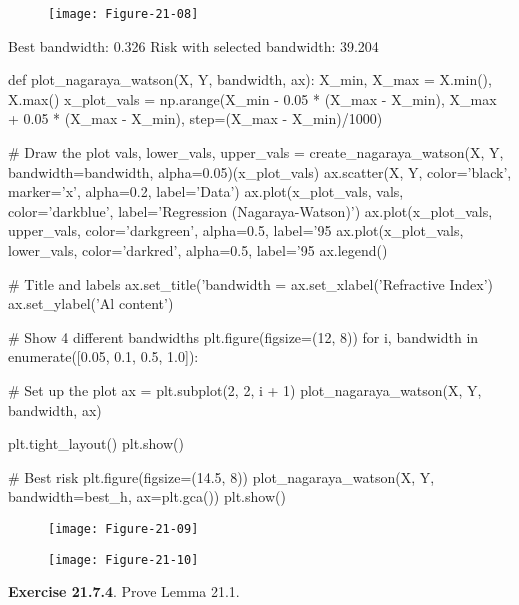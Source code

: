 \begin{figure}[H]
\texttt{[image: Figure-21-08]}
\end{figure}

\begin{console}
Best bandwidth:                 0.326
Risk with selected bandwidth:   39.204
\end{console}

\begin{python}
def plot_nagaraya_watson(X, Y, bandwidth, ax):
    X_min, X_max = X.min(), X.max()
    x_plot_vals = np.arange(X_min - 0.05 * (X_max - X_min), X_max + 0.05 * (X_max - X_min), step=(X_max - X_min)/1000)
      
    # Draw the plot
    vals, lower_vals, upper_vals = create_nagaraya_watson(X, Y, bandwidth=bandwidth, alpha=0.05)(x_plot_vals)
    ax.scatter(X, Y, color='black', marker='x', alpha=0.2, label='Data')
    ax.plot(x_plot_vals, vals, color='darkblue', label='Regression (Nagaraya-Watson)')
    ax.plot(x_plot_vals, upper_vals, color='darkgreen', alpha=0.5, label='95%
    ax.plot(x_plot_vals, lower_vals, color='darkred', alpha=0.5, label='95%
    ax.legend()
    
    # Title and labels
    ax.set_title('bandwidth = %
    ax.set_xlabel('Refractive Index')    
    ax.set_ylabel('Al content')

# Show 4 different bandwidths
plt.figure(figsize=(12, 8))
for i, bandwidth in enumerate([0.05, 0.1, 0.5, 1.0]):
    
    # Set up the plot
    ax = plt.subplot(2, 2, i + 1)
    plot_nagaraya_watson(X, Y, bandwidth, ax)

plt.tight_layout()
plt.show()

# Best risk
plt.figure(figsize=(14.5, 8))
plot_nagaraya_watson(X, Y, bandwidth=best_h, ax=plt.gca())
plt.show()
\end{python}

\begin{figure}[H]
\texttt{[image: Figure-21-09]}
\end{figure}

\begin{figure}[H]
\texttt{[image: Figure-21-10]}
\end{figure}

\textbf{Exercise 21.7.4}. Prove Lemma 21.1.

